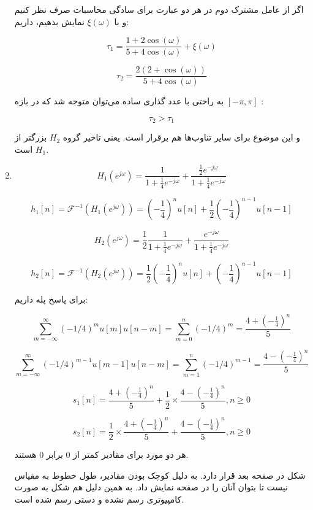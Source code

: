 \documentclass[12pt]{article}
\begin{document}
\begin{enumerate}
	اگر از عامل مشترک دوم در هر دو عبارت برای سادگی محاسبات صرف نظر کنیم و با $\xi(\omega)$ نمایش بدهیم، داریم:
	
	$$\tau_1 =\frac{1+ 2 \cos (\omega)}{5 + 4 \cos (\omega)} + \xi(\omega)$$
	
	$$\tau_2 = \frac{2(2 + \cos (\omega))}{5 + 4 \cos (\omega)}$$
		
		به راحتی با عدد گذاری ساده می‌توان متوجه شد که در بازه
		 $[-\pi,\pi]$
		 :
		 
		$$\tau_2 > \tau_1$$
		
		و این موضوع برای سایر تناوب‌ها هم برقرار است.
		یعنی تاخیر گروه $H_2$ بزرگتر از $H_1$ است.
		
		\item
		
$$H_1(e^{j\omega}) = \frac{1}{1+\frac{1}{4} e^{-j \omega}} + \frac{\frac{1}{2}e^{-j \omega}}{1 + \frac{1}{4} e^{-j\omega}}$$

$$h_1[n] = \mathcal{F}^{-1}(H_1(e^{j \omega})) = (-\frac{1}{4})^n u[n] + \frac{1}{2} (-\frac{1}{4})^{n-1}u[n-1]$$


$$H_2(e^{j\omega}) = \frac{1}{2} \frac{1}{1+\frac{1}{4}e^{-j\omega}}+\frac{e^{-j\omega}}{1+\frac{1}{4}e^{-j\omega}}$$

$$h_2[n] = \mathcal{F}^{-1}(H_2(e^{j \omega})) = \frac{1}{2}(-\frac{1}{4})^n u[n] + (-\frac{1}{4})^{n-1}u[n-1]$$


برای پاسخ پله داریم:

$$\sum_{m=-\infty}^{\infty} (-1/4)^m u[m] u[n-m] = \sum_{m=0}^{n} (-1/4)^m = \frac{4+(-\frac{1}{4})^n}{5}$$



$$\sum_{m=-\infty}^{\infty} (-1/4)^{m-1} u[m-1] u[n-m] = \sum_{m=1}^{n} (-1/4)^{m-1} = \frac{4-(-\frac{1}{4})^{n}}{5}$$


$$s_1[n] = \frac{4+(-\frac{1}{4})^n}{5} + \frac{1}{2}\times \frac{4-(-\frac{1}{4})^{n}}{5} , n\geq 0$$

$$s_2[n] = \frac{1}{2} \times \frac{4+(-\frac{1}{4})^n}{5} + \frac{4-(-\frac{1}{4})^{n}}{5} , n \geq 0 $$

هر دو مورد برای مقادیر کمتر از $0$ برابر $0$ هستند.

شکل در صفحه بعد قرار دارد. به دلیل کوچک بودن مقادیر، طول خطوط به مقیاس نیست تا بتوان آنان را در صفحه نمایش داد. به همین دلیل هم شکل به صورت کامپیوتری رسم نشده و دستی رسم شده است.


\end{enumerate}
\end{document}
